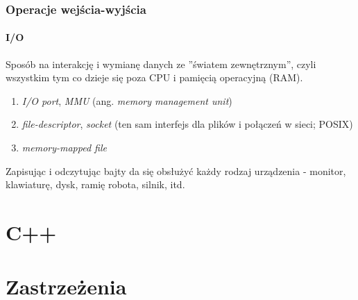 \documentclass[aspectratio=169]{beamer}
\begin{document}
\begin{frame}
    \frametitle{Operacje wejścia-wyjścia}
    \framesubtitle{I/O}

    Sposób na interakcję i wymianę danych ze ''światem zewnętrznym'', czyli
    wszystkim tym co dzieje się poza CPU i pamięcią operacyjną (RAM).

    \begin{enumerate}
        \item \emph{I/O port}, \emph{MMU} (ang. \emph{memory management unit})
        \item \emph{file-descriptor}, \emph{socket} (ten sam interfejs dla
            plików i połączeń w sieci; POSIX)
        \item \emph{memory-mapped file}
    \end{enumerate}

    Zapisując i odczytując bajty da się obsłużyć każdy rodzaj urządzenia -
    monitor, klawiaturę, dysk, ramię robota, silnik, itd.
\end{frame}

\section{C++}

\section{Zastrzeżenia}
\end{document}
